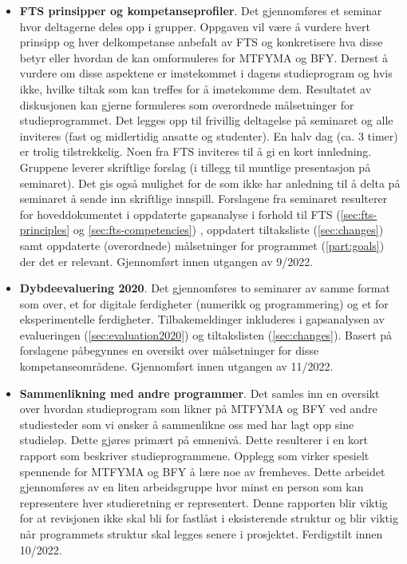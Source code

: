 \begin{itemize}
	\item \textbf{FTS prinsipper og kompetanseprofiler}. Det gjennomføres et seminar hvor deltagerne deles opp i grupper. Oppgaven vil være å vurdere hvert prinsipp og hver delkompetanse anbefalt av FTS og konkretisere hva disse betyr eller hvordan de kan omformuleres for MTFYMA og BFY. Dernest å vurdere om disse aspektene er imøtekommet i dagens studieprogram og hvis ikke, hvilke tiltak som kan treffes for å imøtekomme dem. Resultatet av diskusjonen kan gjerne formuleres som overordnede målsetninger for studieprogrammet. Det legges opp til frivillig deltagelse på seminaret og alle inviteres (fast og midlertidig ansatte og studenter). En halv dag (ca. 3 timer) er trolig tilstrekkelig. Noen fra FTS inviteres til å gi en kort innledning. Gruppene leverer skriftlige forslag (i tillegg til muntlige presentasjon på seminaret). Det gis også mulighet for de som ikke har anledning til å delta på seminaret å sende inn skriftlige innspill. Forslagene fra seminaret resulterer for hoveddokumentet i oppdaterte gapsanalyse i forhold til FTS (\ref{sec:fts-principles} og \ref{sec:fts-competencies}) , oppdatert tiltaksliste (\ref{sec:changes}) samt oppdaterte (overordnede) målsetninger for programmet (\ref{part:goals}) der det er relevant. Gjennomført innen utgangen av 9/2022.
	\item \textbf{Dybdeevaluering 2020}. Det gjennomføres to seminarer av samme format som over, et for digitale ferdigheter (numerikk og programmering) og et for eksperimentelle ferdigheter. Tilbakemeldinger inkluderes i gapsanalysen av evalueringen (\ref{sec:evaluation2020}) og tiltakslisten (\ref{sec:changes}). Basert på forslagene påbegynnes en oversikt over målsetninger for disse kompetanseområdene. Gjennomført innen utgangen av 11/2022.
	\item \textbf{Sammenlikning med andre programmer}. Det samles inn en oversikt over hvordan studieprogram som likner på MTFYMA og BFY ved andre studiesteder som vi ønsker å sammenlikne oss med har lagt opp sine studieløp. Dette gjøres primært på emnenivå. Dette resulterer i en kort rapport som beskriver studieprogrammene. Opplegg som virker spesielt spennende for MTFYMA og BFY å lære noe av fremheves. Dette arbeidet gjennomføres av en liten arbeidsgruppe hvor minst en person som kan representere hver studieretning er representert. Denne rapporten blir viktig for at revisjonen ikke skal bli for fastlåst i eksisterende struktur og blir viktig når programmets struktur skal legges senere i prosjektet. Ferdigstilt innen 10/2022.

\end{itemize}
